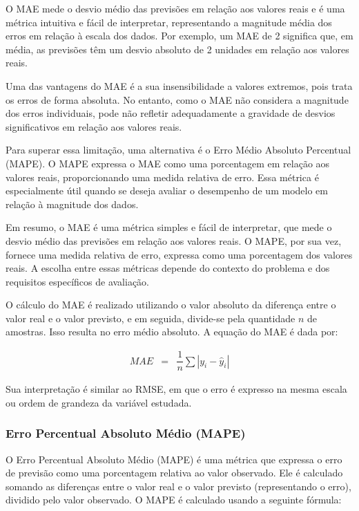 O MAE mede o desvio médio das previsões em relação aos valores reais e é uma métrica intuitiva e fácil de interpretar, representando a magnitude média dos erros em relação à escala dos dados. Por exemplo, um MAE de 2 significa que, em média, as previsões têm um desvio absoluto de 2 unidades em relação aos valores reais.

Uma das vantagens do MAE é a sua insensibilidade a valores extremos, pois trata os erros de forma absoluta. No entanto, como o MAE não considera a magnitude dos erros individuais, pode não refletir adequadamente a gravidade de desvios significativos em relação aos valores reais.

Para superar essa limitação, uma alternativa é o Erro Médio Absoluto Percentual (MAPE). O MAPE expressa o MAE como uma porcentagem em relação aos valores reais, proporcionando uma medida relativa de erro. Essa métrica é especialmente útil quando se deseja avaliar o desempenho de um modelo em relação à magnitude dos dados.

Em resumo, o MAE é uma métrica simples e fácil de interpretar, que mede o desvio médio das previsões em relação aos valores reais. O MAPE, por sua vez, fornece uma medida relativa de erro, expressa como uma porcentagem dos valores reais. A escolha entre essas métricas depende do contexto do problema e dos requisitos específicos de avaliação.

O cálculo do MAE é realizado utilizando o valor absoluto da diferença entre o valor real e o valor previsto, e em seguida, divide-se pela quantidade $n$ de amostras. Isso resulta no erro médio absoluto. A equação do MAE é dada por:

\begin{eqnarray}
	M A E &=& \dfrac{1}{n} \sum\left|y_i-\hat{y}_i\right|\label{eq:mae}
\end{eqnarray}

Sua interpretação é similar ao RMSE, em que o erro é expresso na mesma escala ou ordem de grandeza da variável estudada.

\subsubsection{Erro Percentual Absoluto M\'edio (MAPE)}

O Erro Percentual Absoluto Médio (MAPE) é uma métrica que expressa o erro de previsão como uma porcentagem relativa ao valor observado. Ele é calculado somando as diferenças entre o valor real e o valor previsto (representando o erro), dividido pelo valor observado.
O MAPE é calculado usando a seguinte fórmula:

